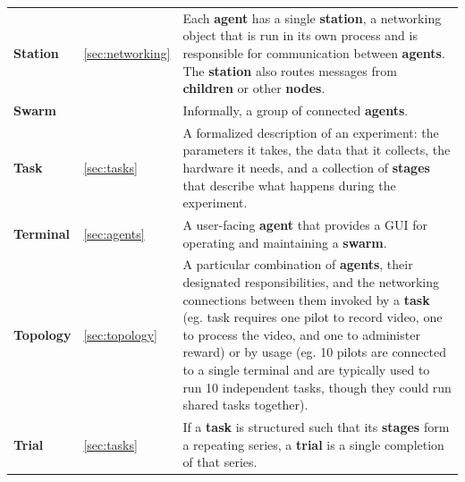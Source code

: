 \begin{fullwidth}
\begin{table}[!hb]
\begin{tabularx}{\linewidth}{llX}
 \textbf{Station} & \ref{sec:networking} & Each \textbf{agent} has a single \textbf{station}, a networking object that is run in its own process and is responsible for communication between \textbf{agents}. The \textbf{station} also routes messages from \textbf{children} or other \textbf{nodes}. \\
 \textbf{Swarm} & & Informally, a group of connected \textbf{agents}. \\
 \textbf{Task} & \ref{sec:tasks} & A formalized description of an experiment: the parameters it takes, the data that it collects, the hardware it needs, and a collection of \textbf{stages} that describe what happens during the experiment.  \\
 \textbf{Terminal} & \ref{sec:agents} & A user-facing \textbf{agent} that provides a GUI for operating and maintaining a \textbf{swarm}.  \\
\textbf{Topology} & \ref{sec:topology} & A particular combination of \textbf{agents}, their designated responsibilities, and the networking connections between them invoked by a \textbf{task} (eg. task requires one pilot to record video, one to process the video, and one to administer reward) or by usage (eg. 10 pilots are connected to a single terminal and are typically used to run 10 independent tasks, though they could run shared tasks together). \\
\textbf{Trial} & \ref{sec:tasks} & If a \textbf{task} is structured such that its \textbf{stages} form a repeating series, a \textbf{trial} is a single completion of that series.%
\end{tabularx}%
\end{table}%
\end{fullwidth}
%
\backmatter
\begin{fullwidth}



\end{fullwidth}



